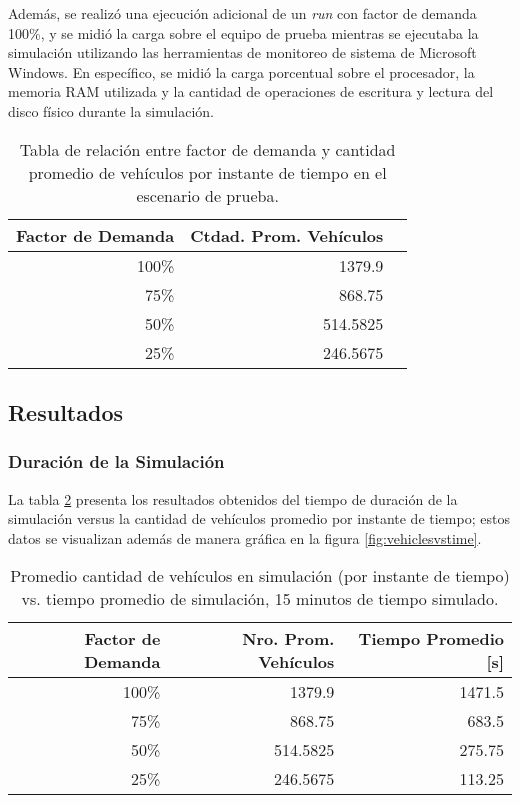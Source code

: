 Además, se realizó una ejecución adicional de un \emph{run} con factor de demanda 100\%, y se midió la carga sobre el equipo de prueba mientras se ejecutaba la simulación utilizando las herramientas de monitoreo de sistema de Microsoft Windows. En específico, se midió la carga porcentual sobre el procesador, la memoria RAM utilizada y la cantidad de operaciones de escritura y lectura del disco físico durante la simulación.

\begin{table}[htpb]
    \centering
    \begin{tabular}{@{}rrr@{}}
        \textbf{Factor de Demanda} & \textbf{Ctdad. Prom. Vehículos} \\ \midrule
        100\%           & 1379.9 \\ %
        75\%            & 868.75 \\ %
        50\%            & 514.5825 \\ %
        25\%            & 246.5675 \\ \bottomrule
    \end{tabular}
    \caption[Factor de demanda vs. cantidad promedio de vehículos]{Tabla de relación entre factor de demanda y cantidad promedio de vehículos por instante de tiempo en el escenario de prueba.}
    \label{table:demandfactor}
\end{table}

\subsection{Resultados}

\subsubsection{Duración de la Simulación}

La tabla \ref{table:vehiclesvstime} presenta los resultados obtenidos del tiempo de duración de la simulación versus la cantidad de vehículos promedio por instante de tiempo; estos datos se visualizan además de manera gráfica en la figura \ref{fig:vehiclesvstime}.

\begin{table}[tpb]
    \centering
    \begin{tabular}{@{}rrr@{}}
        \textbf{Factor de Demanda} & \textbf{Nro. Prom. Vehículos} & \textbf{Tiempo Promedio [s]} \\ \midrule
        100\%           & 1379.9          & 1471.5              \\ %
        75\%            & 868.75          & 683.5               \\ %
        50\%            & 514.5825        & 275.75              \\ %
        25\%            & 246.5675        & 113.25              \\ \bottomrule
    \end{tabular}
    \caption[Cantidad de vehículos vs. tiempo real de simulación]{Promedio cantidad de vehículos en simulación (por instante de tiempo) vs. tiempo promedio de simulación, 15 minutos de tiempo simulado.}
    \label{table:vehiclesvstime}
\end{table}

